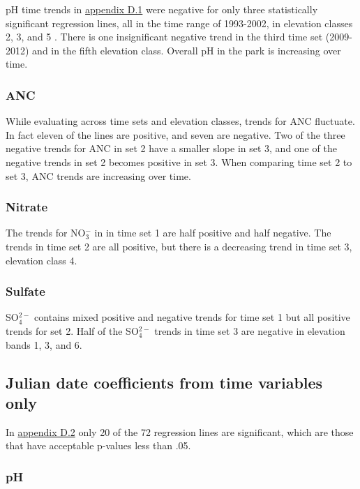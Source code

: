 pH time trends in \hyperref[app:Step-wise julian date]{appendix D.1} were negative for only three statistically significant regression lines, all in the time range of 1993-2002, in elevation classes 2, 3, and 5 .   
There is one insignificant negative trend in the third time set (2009-2012) and in the fifth elevation class.   
Overall pH in the park is increasing over time.

\subsubsection{ANC}

While evaluating across time sets and elevation classes, trends for ANC fluctuate.
In fact eleven of the lines are positive, and seven are negative.   
Two of the three negative trends for ANC in set 2 have a smaller slope in set 3, and one of the negative trends in set 2 becomes positive in set 3.  
When comparing time set 2 to set 3, ANC trends are increasing over time. 

\subsubsection{Nitrate}

The trends for NO$_3^-$ in in time set 1 are half positive and half negative.
The trends in time set 2 are all positive, but there is a decreasing trend in time set 3, elevation class 4. 

\subsubsection{Sulfate}

SO$_4^{2-}$ contains mixed positive and negative trends for time set 1 but all positive trends for set 2. 
Half of the SO$_4^{2-}$ trends in time set 3 are negative in elevation bands 1, 3, and 6.

\subsection{Julian date coefficients from time variables only}

In \hyperref[app:time vars]{appendix D.2} only 20 of the 72 regression lines are significant,  which are those that have acceptable p-values less than .05.

\subsubsection{pH}

